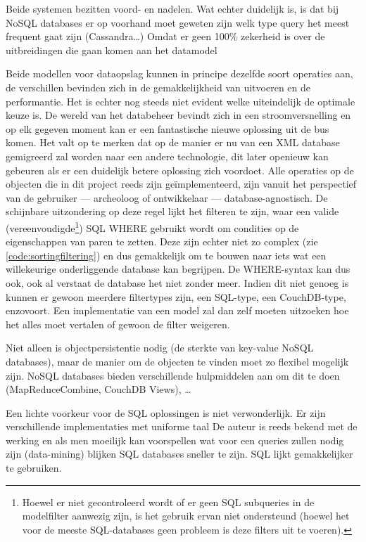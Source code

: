 Beide systemen bezitten voord- en nadelen. Wat echter duidelijk is, is dat bij NoSQL databases er op voorhand moet geweten zijn welk type query het meest frequent gaat zijn (Cassandra\ldots)
 Omdat er geen 100\% zekerheid is over de uitbreidingen die gaan komen aan het datamodel

Beide modellen voor dataopslag kunnen in principe dezelfde soort operaties aan, de verschillen bevinden zich in de gemakkelijkheid van uitvoeren en de performantie. Het is echter nog steeds niet evident welke uiteindelijk de optimale keuze is. De wereld van het databeheer bevindt zich in een stroomversnelling en op elk gegeven moment kan er een fantastische nieuwe oplossing uit de bus komen. Het valt op te merken dat op de manier er nu van een XML database gemigreerd zal worden naar een andere technologie, dit later openieuw kan gebeuren als er een duidelijk betere oplossing zich voordoet. Alle operaties op de objecten die in dit project reeds zijn ge\"implementeerd, zijn vanuit het perspectief van de gebruiker --- archeoloog of ontwikkelaar --- database-agnostisch. De schijnbare uitzondering op deze regel lijkt het filteren te zijn, waar een valide (vereenvoudigde\footnote{Hoewel er niet gecontroleerd wordt of er geen SQL subqueries in de modelfilter aanwezig zijn, is het gebruik ervan niet ondersteund (hoewel het voor de meeste SQL-databases geen probleem is deze filters uit te voeren).}) SQL WHERE gebruikt wordt om condities op de eigenschappen van paren te zetten. Deze zijn echter niet zo complex (zie \ref{code:sortingfiltering}) en dus gemakkelijk om te bouwen naar iets wat een willekeurige onderliggende database kan begrijpen. De WHERE-syntax kan dus ook, ook al verstaat de database het niet zonder meer. Indien dit niet genoeg is kunnen er gewoon meerdere filtertypes zijn, een SQL-type, een CouchDB-type, enzovoort. Een implementatie van een model zal dan zelf moeten uitzoeken hoe het alles moet vertalen of gewoon de filter weigeren.

Niet alleen is objectpersistentie nodig (de sterkte van key-value NoSQL databases), maar de manier om de objecten te vinden moet zo flexibel mogelijk zijn. NoSQL databases bieden verschillende hulpmiddelen aan om dit te doen (MapReduceCombine, CouchDB Views), \ldots 

Een lichte voorkeur voor de SQL oplossingen is niet verwonderlijk. Er zijn verschillende implementaties met uniforme taal De auteur is reeds bekend met de werking en als men moeilijk kan voorspellen wat voor een queries zullen nodig zijn (data-mining) blijken SQL databases sneller te zijn. SQL lijkt gemakkelijker te gebruiken.\\

